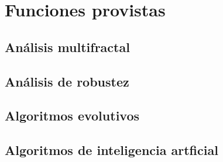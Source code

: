 \section{Funciones provistas}

\subsection{Análisis multifractal}

\subsection{Análisis de robustez}

\subsection{Algoritmos evolutivos}

\subsection{Algoritmos de inteligencia artficial}